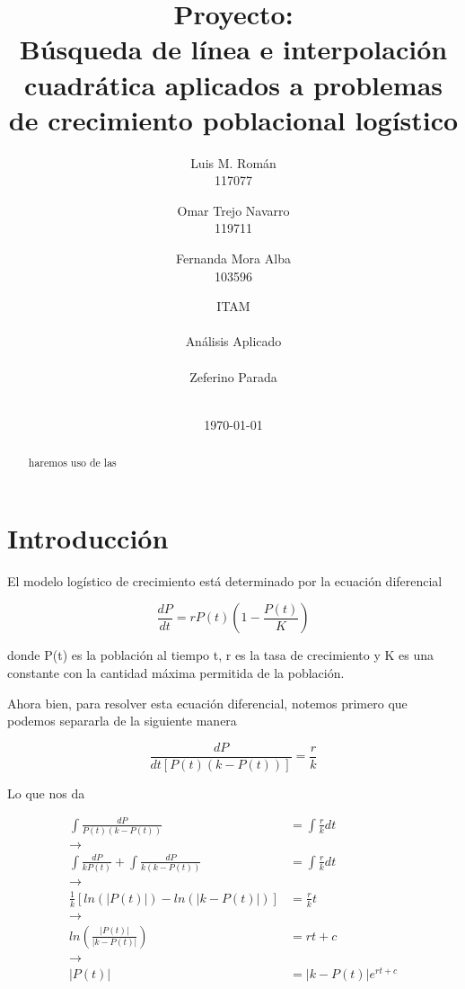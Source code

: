 \documentclass[11pt]{article}
\title{\textbf{Proyecto:\\
Búsqueda de línea e interpolación cuadrática aplicados a problemas de crecimiento poblacional logístico} \vspace{1cm}}
\author{
    Luis M. Román\\
    117077
    \and
    Omar Trejo Navarro\\
    119711 \\
    \and
    Fernanda Mora Alba\\
    103596  \\
    \vspace{0.5cm}
    \and
    \Large{ITAM} \\ \\
    \large{Análisis Aplicado} \\ \\
    \large{Zeferino Parada} \\ \\
}
\date{\today}
\begin{document}
\newtheorem{theorem}{Theorem}[section]
\VerbatimFootnotes
\maketitle


\begin{abstract}
haremos uso de las

\end{abstract}


\section{Introducción}

El modelo logístico de crecimiento está determinado por la ecuación diferencial


\begin{equation}
\frac{dP}{dt} = rP(t)(1 - \frac{P(t)}{K})
\end{equation}


donde P(t) es la población al tiempo t, r es la tasa de crecimiento y K es una constante con la cantidad máxima permitida de la población.

Ahora bien, para resolver esta ecuación diferencial, notemos primero que podemos separarla de la siguiente manera

\begin{equation*}
\frac{dP}{dt[P(t)(k - P(t))]} = \frac{r}{k}
\end{equation*}


Lo que nos da

\begin{equation*}
\begin{split}
\int\frac{dP}{P(t)(k - P(t))}                     & = \int\frac{r}{k}dt\\
\rightarrow & \\
\int\frac{dP}{kP(t)} + \int\frac{dP}{k(k - P(t))} & = \int\frac{r}{k}dt\\
\rightarrow & \\
\frac{1}{k}[ln(|P(t)|) - ln(|k - P(t)|)]          & = \frac{r}{k}t\\
\rightarrow & \\
ln(\frac{|P(t)|}{|k - P(t)|})                     & = rt + c\\
\rightarrow & \\
|P(t)|                              & = |k - P(t)|e^{rt + c}\\
\end{split}
\end{equation*}
\end{document}

